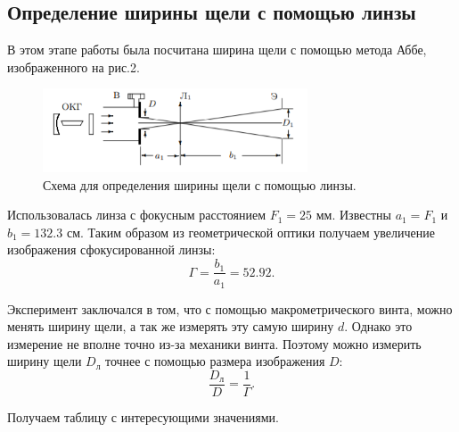 \documentclass[a4paper, 14pt]{extarticle}%
\newcommand\ECaption[1]{%
     \captionsetup{font=footnotesize}%
     \caption{#1}}
\begin{document}
\subsection*{Определение ширины щели с помощью линзы}

В этом этапе работы была посчитана ширина щели с помощью метода Аббе, изображенного на рис.2. 
\begin{figure}[h!]
\begin{center}
\includegraphics[width=0.7\textwidth]{ust1}
\end{center}
\ECaption{Схема для определения ширины щели с помощью линзы.}
\end{figure}

Использовалась линза с фокусным расстоянием $F_1 = 25$ мм. Известны $a_1=F_1$ и $b_1=132.3$ см. Таким образом из геометрической оптики получаем увеличение изображения сфокусированной линзы:
\[\Gamma = \frac{b_1}{a_1} = 52.92.\]

Эксперимент заключался в том, что с помощью макрометрического винта, можно менять ширину щели, а так же измерять эту самую ширину $d$. Однако это измерение не вполне точно из-за механики винта. Поэтому можно измерить ширину щели $D_{\text{л}}$ точнее с помощью размера изображения $D$:
\[\frac{D_{\text{л}}}{D} = \frac{1}{\Gamma}.\] 

Получаем таблицу с интересующими значениями.
\end{document}
